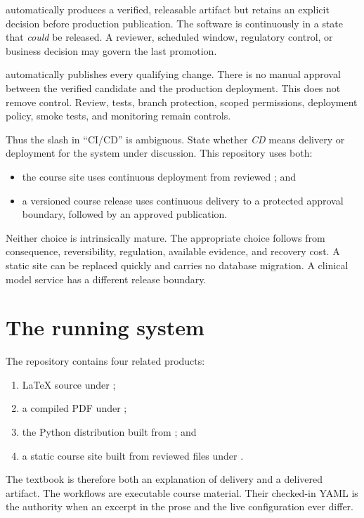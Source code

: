  automatically produces a verified, releasable
artifact but retains an explicit decision before production publication. The
software is continuously in a state that \emph{could} be released. A reviewer,
scheduled window, regulatory control, or business decision may govern the last
promotion.

 automatically publishes every qualifying change.
There is no manual approval between the verified candidate and the production
deployment. This does not remove control. Review, tests, branch protection,
scoped permissions, deployment policy, smoke tests, and monitoring remain
controls.

Thus the slash in ``CI/CD'' is ambiguous. State whether \emph{CD} means
delivery or deployment for the system under discussion. This repository uses
both:

\begin{itemize}
  \item the course site uses continuous deployment from reviewed ;
  and
  \item a versioned course release uses continuous delivery to a protected
  approval boundary, followed by an approved publication.
\end{itemize}

Neither choice is intrinsically mature. The appropriate choice follows from
consequence, reversibility, regulation, available evidence, and recovery cost.
A static site can be replaced quickly and carries no database migration. A
clinical model service has a different release boundary.

\section{The running system}

The repository contains four related products:

\begin{enumerate}
  \item LaTeX source under ;
  \item a compiled PDF under ;
  \item the  Python distribution built from ; and
  \item a static course site built from reviewed files under .
\end{enumerate}

The textbook is therefore both an explanation of delivery and a delivered
artifact. The workflows are executable course material. Their checked-in YAML
is the authority when an excerpt in the prose and the live configuration ever
differ.

